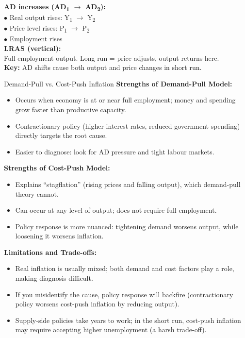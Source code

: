 \documentclass[11pt, a4paper, twoside]{book}
\begin{document}
\begin{diagrambox}
{}{%
\textbf{\color{NavyPrimary}AD increases (AD\textsubscript{1} $\to$ AD\textsubscript{2}):}\\[4pt]
$\bullet$ Real output rises: Y\textsubscript{1} $\to$ Y\textsubscript{2}\\[2pt]
$\bullet$ Price level rises: P\textsubscript{1} $\to$ P\textsubscript{2}\\[2pt]
$\bullet$ Employment rises\\[6pt]
\textbf{\color{NavyPrimary}LRAS (vertical):}\\[2pt]
Full employment output. Long run = price adjusts, output returns here.\\[6pt]
\textbf{\color{GoldAccent}Key:} AD shifts cause both output and price changes in short run.%
}
\end{diagrambox}

\begin{evaluation}{Demand-Pull vs. Cost-Push Inflation}
\textbf{Strengths of Demand-Pull Model:}
\begin{itemize}[leftmargin=*, nosep]
\item Occurs when economy is at or near full employment; money and spending grow faster than productive capacity.
\item Contractionary policy (higher interest rates, reduced government spending) directly targets the root cause.
\item Easier to diagnose: look for AD pressure and tight labour markets.
\end{itemize}
\textbf{Strengths of Cost-Push Model:}
\begin{itemize}[leftmargin=*, nosep]
\item Explains ``stagflation'' (rising prices and falling output), which demand-pull theory cannot.
\item Can occur at any level of output; does not require full employment.
\item Policy response is more nuanced: tightening demand worsens output, while loosening it worsens inflation.
\end{itemize}
\textbf{Limitations and Trade-offs:}
\begin{itemize}[leftmargin=*, nosep]
\item Real inflation is usually mixed; both demand and cost factors play a role, making diagnosis difficult.
\item If you misidentify the cause, policy response will backfire (contractionary policy worsens cost-push inflation by reducing output).
\item Supply-side policies take years to work; in the short run, cost-push inflation may require accepting higher unemployment (a harsh trade-off).

\end{itemize}
\end{evaluation}
\end{document}
